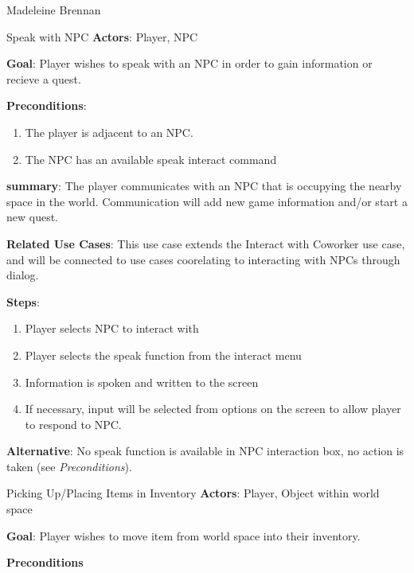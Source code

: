 \documentclass[12pt]{report}
\begin{document}
\begin{section}{Madeleine Brennan}
\begin{subsection}{Speak with NPC}
\textbf{Actors}:
Player, NPC

\textbf{Goal}:
Player wishes to speak with an NPC in order to gain information or recieve 
a quest.

\textbf{Preconditions}:
\begin{enumerate}
\item The player is adjacent to an NPC.
\item The NPC has an available speak interact command
\end{enumerate}

\textbf{summary}:
The player communicates with an NPC that is occupying the nearby space 
in the world. Communication will add new game information and/or start
a new quest.

\textbf{Related Use Cases}:
This use case extends the Interact with Coworker use case, and will be 
connected to use cases coorelating to interacting with NPCs through 
dialog.

\textbf{Steps}:
\begin{enumerate}
\item Player selects NPC to interact with
\item Player selects the speak function from the interact menu
\item Information is spoken and written to the screen
\item If necessary, input will be selected from options on the screen
	to allow player to respond to NPC.
\end{enumerate}

\textbf{Alternative}:
No speak function is available in NPC interaction box, no action is 
taken (see \textit{Preconditions}).
\end{subsection}

\begin{subsection}{Picking Up/Placing Items in Inventory}
\textbf{Actors}:
Player, Object within world space

\textbf{Goal}:
Player wishes to move item from world space into their inventory.

\textbf{Preconditions}
\end{subsection}
\end{section}
\end{document}
